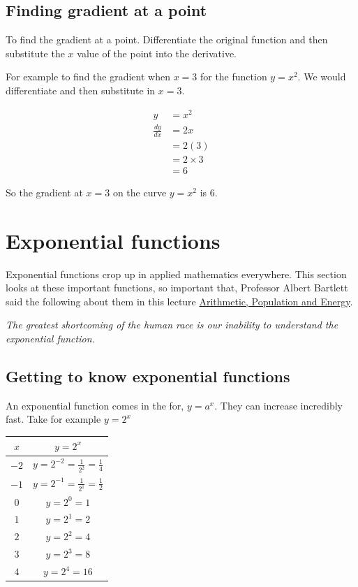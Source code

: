 \documentclass[
  a4paper,
]{scrbook}
\begin{document}
\hypertarget{finding-gradient-at-a-point}{%
\section{Finding gradient at a
point}\label{finding-gradient-at-a-point}}

To find the gradient at a point. Differentiate the original function and
then substitute the \(x\) value of the point into the derivative.

For example to find the gradient when \(x=3\) for the function
\(y=x^2\). We would differentiate and then substitute in \(x=3\).

\[
\begin{aligned} y &= x^2 \\
\frac{dy}{dx} &= 2x \\
&= 2(3) \\
&= 2 \times 3 \\
&= 6
\end{aligned}
\]

So the gradient at \(x=3\) on the curve \(y=x^2\) is \(6\).


\hypertarget{exponential-functions}{%
\chapter{Exponential functions}\label{exponential-functions}}

Exponential functions crop up in applied mathematics everywhere. This
section looks at these important functions, so important that, Professor
Albert Bartlett said the following about them in this lecture
\href{https://www.youtube.com/watch?v=sI1C9DyIi_8}{Arithmetic,
Population and Energy}.

\emph{The greatest shortcoming of the human race is our inability to
understand the exponential function.}

\hypertarget{getting-to-know-exponential-functions}{%
\section{Getting to know exponential
functions}\label{getting-to-know-exponential-functions}}

An exponential function comes in the for, \(y=a^x\). They can increase
incredibly fast. Take for example \(y=2^x\)

\begin{longtable}[]{@{}cc@{}}
\toprule()
\(x\) & \(y=2^x\) \\
\midrule()
\endhead
\(-2\) & \(y = 2^{-2} = \frac{1}{2^2} = \frac{1}{4}\) \\
\(-1\) & \(y = 2^{-1} = \frac{1}{2^1} = \frac{1}{2}\) \\
\(0\) & \(y = 2^{0} = 1\) \\
\(1\) & \(y = 2^{1} = 2\) \\
\(2\) & \(y = 2^{2} = 4\) \\
\(3\) & \(y = 2^{3} = 8\) \\
\(4\) & \(y = 2^{4} = 16\) \\
\bottomrule()
\end{longtable}
\end{document}
